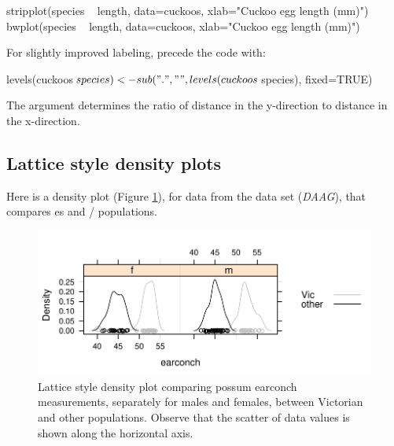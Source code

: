 \begin{Schunk}
\begin{Sinput}
stripplot(species ~ length, data=cuckoos,
          xlab="Cuckoo egg length (mm)")
bwplot(species ~ length, data=cuckoos,
       xlab="Cuckoo egg length (mm)")
\end{Sinput}
\end{Schunk}
\begin{marginfigure}[-36pt]
For slightly improved labeling, precede the code with:
\begin{Schunk}
\begin{Sinput}
levels(cuckoos$species) <-
 sub(".", " ",
  levels(cuckoos$species),
  fixed=TRUE)
\end{Sinput}
\end{Schunk}
\end{marginfigure}
The  argument determines the ratio of distance
in the y-direction to distance in the x-direction.

\subsection*{Lattice style density plots}
Here is a density plot (Figure \ref{fig:possumdens}), for data from
the  data set (\textit{DAAG}), that compares es
and / populations.
\begin{figure}
\begin{center}
\begin{Schunk}


\centerline{\includegraphics[width=\textwidth]{figs/09-lattice-density-1} }

\end{Schunk}
\end{center}
  \caption{Lattice style density plot comparing possum earconch
    measurements, separately for males and females, between Victorian
    and other populations. Observe that the scatter of data values is
shown along the horizontal axis.}\label{fig:possumdens}
\vspace*{-36pt}
\end{figure}


